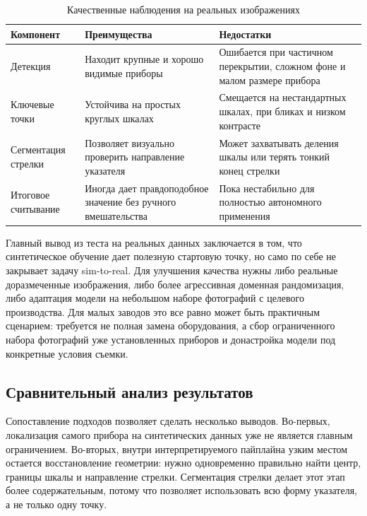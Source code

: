\documentclass[a4paper,14pt]{extarticle}
\begin{document}
	\begin{table}[htbp]
		\caption{Качественные наблюдения на реальных изображениях}
		\label{tab:real_qualitative}
		\centering
		\begingroup
		\fontsize{12}{14}\selectfont
		\begin{tabularx}{\textwidth}{>{\raggedright\arraybackslash}p{3.3cm} X X}
			\toprule
			Компонент & Преимущества & Недостатки \\
			\midrule
			Детекция & Находит крупные и хорошо видимые приборы & Ошибается при частичном перекрытии, сложном фоне и малом размере прибора \\
			Ключевые точки & Устойчива на простых круглых шкалах & Смещается на нестандартных шкалах, при бликах и низком контрасте \\
			Сегментация стрелки & Позволяет визуально проверить направление указателя & Может захватывать деления шкалы или терять тонкий конец стрелки \\
			Итоговое считывание & Иногда дает правдоподобное значение без ручного вмешательства & Пока нестабильно для полностью автономного применения \\
			\bottomrule
		\end{tabularx}
		\endgroup
	\end{table}

	Главный вывод из теста на реальных данных заключается в том, что синтетическое обучение дает полезную стартовую точку, но само по себе не закрывает задачу sim-to-real. Для улучшения качества нужны либо реальные доразмеченные изображения, либо более агрессивная доменная рандомизация, либо адаптация модели на небольшом наборе фотографий с целевого производства. Для малых заводов это все равно может быть практичным сценарием: требуется не полная замена оборудования, а сбор ограниченного набора фотографий уже установленных приборов и донастройка модели под конкретные условия съемки.

	\subsection{Сравнительный анализ результатов}

	Сопоставление подходов позволяет сделать несколько выводов. Во-первых, локализация самого прибора на синтетических данных уже не является главным ограничением. Во-вторых, внутри интерпретируемого пайплайна узким местом остается восстановление геометрии: нужно одновременно правильно найти центр, границы шкалы и направление стрелки. Сегментация стрелки делает этот этап более содержательным, потому что позволяет использовать всю форму указателя, а не только одну точку.
\end{document}
